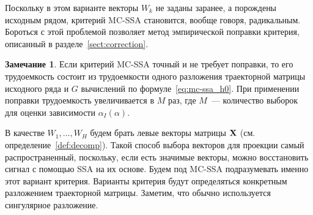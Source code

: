 \documentclass[specialist,
substylefile = spbu.rtx,
               subf,href,colorlinks=true,12pt]{disser}
\theoremstyle{definition}
\newtheorem{remark}{Замечание}
\begin{document}
Поскольку в этом варианте векторы $W_k$ не заданы заранее, а порождены исходным рядом, критерий MC-SSA становится, вообще говоря, радикальным. Бороться с этой проблемой позволяет метод эмпирической поправки критерия, описанный в разделе~\ref{sect:correction}.
\begin{remark}\label{remark:complexity}
	Если критерий MC-SSA точный и не требует поправки, то его трудоемкость состоит из трудоемкости одного разложения траекторной матрицы исходного ряда и $G$ вычислений по формуле~\eqref{eq:mc-ssa_h0}. При применении поправки трудоемкость увеличивается в $M$ раз, где $M$~--- количество выборок для оценки зависимости $\alpha_I(\alpha)$.
\end{remark}
В качестве $W_1, \ldots,W_H$ будем брать левые векторы матрицы $\mathbf{X}$ (см. определение~\ref{def:decomp}). Такой способ выбора векторов для проекции самый распространенный, поскольку, если есть значимые векторы, можно восстановить сигнал с помощью SSA на их основе. Будем под MC-SSA подразумевать именно этот вариант критерия. Варианты критерия будут определяться конкретным разложением траекторной матрицы. Заметим, что обычно используется сингулярное разложение.
\end{document}
